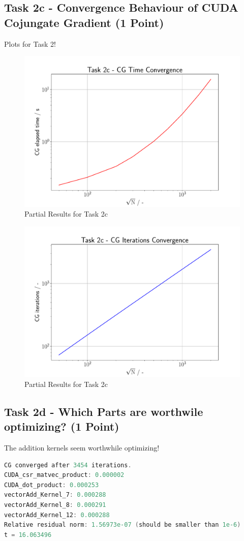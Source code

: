 \pagebreak

\subsection{Task 2c - Convergence Behaviour of CUDA Cojungate Gradient (1 Point)}
Plots for Task 2!
  \begin{figure}[h]
    \begin{center}
      \includegraphics[width= 0.7\linewidth]{figures/task_2_c_1.pdf}
      \caption{Partial Results for Task 2c}
      \label{label_2c1_figure}
    \end{center}
  \end{figure}

  \begin{figure}[h]
    \begin{center}
      \includegraphics[width= 0.7\linewidth]{figures/task_2_c_2.pdf}
      \caption{Partial Results for Task 2c}
      \label{label_2c2_figure}
    \end{center}
  \end{figure}

\pagebreak

\subsection{Task 2d - Which Parts are worthwile optimizing? (1 Point)}
The addition kernels seem worthwhile optimizing!
\begin{lstlisting}[language=C++, title=C++ Console output for sqrt(N) = 2000]
CG converged after 3454 iterations.
CUDA_csr_matvec_product: 0.000002
CUDA_dot_product: 0.000253
vectorAdd_Kernel_7: 0.000288
vectorAdd_Kernel_8: 0.000291
vectorAdd_Kernel_12: 0.000288
Relative residual norm: 1.56973e-07 (should be smaller than 1e-6)
t = 16.063496
  \end{lstlisting}

\pagebreak